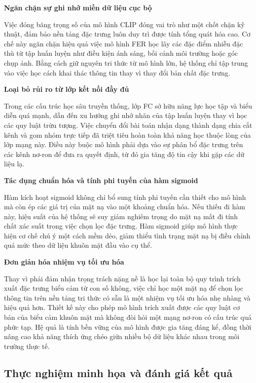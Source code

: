 \textbf{Ngăn chặn sự ghi nhớ miền dữ liệu cục bộ}

Việc đóng băng trọng số của mô hình CLIP đóng vai trò như một chốt chặn kỹ thuật, đảm bảo nền tảng đặc trưng luôn duy trì được tính tổng quát hóa cao. Cơ chế này ngăn chặn hiệu quả việc mô hình FER học lây các đặc điểm nhiễu đặc thù từ tập huấn luyện như điều kiện ánh sáng, bối cảnh môi trường hoặc góc chụp ảnh. Bằng cách giữ nguyên tri thức từ mô hình lớn, hệ thống chỉ tập trung vào việc học cách khai thác thông tin thay vì thay đổi bản chất đặc trưng.

\textbf{Loại bỏ rủi ro từ lớp kết nối đầy đủ}

Trong các cấu trúc học sâu truyền thống, lớp FC sở hữu năng lực học tập và biểu diễn quá mạnh, dẫn đến xu hướng ghi nhớ nhãn của tập huấn luyện thay vì học các quy luật trừu tượng. Việc chuyển đổi bài toán nhận dạng thành dạng chia cắt kênh và gom nhóm trực tiếp đã triệt tiêu hoàn toàn khả năng học thuộc lòng của lớp mạng này. Điều này buộc mô hình phải dựa vào sự phân bổ đặc trưng trên các kênh nơ-ron để đưa ra quyết định, từ đó gia tăng độ tin cậy khi gặp các dữ liệu lạ.

\textbf{Tác dụng chuẩn hóa và tính phi tuyến của hàm sigmoid}

Hàm kích hoạt sigmoid không chỉ bổ sung tính phi tuyến cần thiết cho mô hình mà còn ép các giá trị của mặt nạ vào một khoảng chuẩn hóa. Nếu thiếu đi hàm này, hiệu suất của hệ thống sẽ suy giảm nghiêm trọng do mặt nạ mất đi tính chất xác suất trong việc chọn lọc đặc trưng. Hàm sigmoid giúp mô hình thực hiện cơ chế chú ý một cách mềm dẻo, giảm thiểu tình trạng mặt nạ bị điều chỉnh quá mức theo dữ liệu khuôn mặt đầu vào cụ thể.

\textbf{Đơn giản hóa nhiệm vụ tối ưu hóa}

Thay vì phải đảm nhận trọng trách nặng nề là học lại toàn bộ quy trình trích xuất đặc trưng biểu cảm từ con số không, việc chỉ học một mặt nạ để chọn lọc thông tin trên nền tảng tri thức có sẵn là một nhiệm vụ tối ưu hóa nhẹ nhàng và hiệu quả hơn. Thiết kế này cho phép mô hình trích xuất được các quy luật cơ bản của biểu cảm khuôn mặt mà không đòi hỏi một mạng nơ-ron có cấu trúc quá phức tạp. Hệ quả là tính bền vững của mô hình được gia tăng đáng kể, đồng thời nâng cao khả năng thích ứng chéo giữa nhiều bộ dữ liệu khác nhau trong môi trường thực tế.

\subsection{Thực nghiệm minh họa và đánh giá kết quả}

